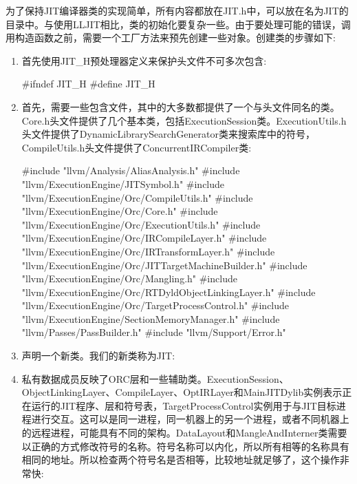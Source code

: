 为了保持JIT编译器类的实现简单，所有内容都放在JIT.h中，可以放在名为JIT的目录中。与使用LLJIT相比，类的初始化要复杂一些。由于要处理可能的错误，调用构造函数之前，需要一个工厂方法来预先创建一些对象。创建类的步骤如下:

\begin{enumerate}
\item
首先使用JIT\_H预处理器定义来保护头文件不可多次包含:

\begin{cpp}
#ifndef JIT_H
#define JIT_H
\end{cpp}

\item
首先，需要一些包含文件，其中的大多数都提供了一个与头文件同名的类。Core.h头文件提供了几个基本类，包括ExecutionSession类。ExecutionUtils.h头文件提供了DynamicLibrarySearchGenerator类来搜索库中的符号，CompileUtils.h头文件提供了ConcurrentIRCompiler类:

\begin{cpp}
#include "llvm/Analysis/AliasAnalysis.h"
#include "llvm/ExecutionEngine/JITSymbol.h"
#include "llvm/ExecutionEngine/Orc/CompileUtils.h"
#include "llvm/ExecutionEngine/Orc/Core.h"
#include "llvm/ExecutionEngine/Orc/ExecutionUtils.h"
#include "llvm/ExecutionEngine/Orc/IRCompileLayer.h"
#include "llvm/ExecutionEngine/Orc/IRTransformLayer.h"
#include "llvm/ExecutionEngine/Orc/JITTargetMachineBuilder.h"
#include "llvm/ExecutionEngine/Orc/Mangling.h"
#include "llvm/ExecutionEngine/Orc/RTDyldObjectLinkingLayer.h"
#include "llvm/ExecutionEngine/Orc/TargetProcessControl.h"
#include "llvm/ExecutionEngine/SectionMemoryManager.h"
#include "llvm/Passes/PassBuilder.h"
#include "llvm/Support/Error.h"
\end{cpp}

\item
声明一个新类。我们的新类称为JIT:

\begin{cpp}
class JIT {
\end{cpp}

\item
私有数据成员反映了ORC层和一些辅助类。ExecutionSession、ObjectLinkingLayer、CompileLayer、OptIRLayer和MainJITDylib实例表示正在运行的JIT程序、层和符号表，TargetProcessControl实例用于与JIT目标进程进行交互。这可以是同一进程，同一机器上的另一个进程，或者不同机器上的远程进程，可能具有不同的架构。DataLayout和MangleAndInterner类需要以正确的方式修改符号的名称。符号名称可以内化，所以所有相等的名称具有相同的地址。所以检查两个符号名是否相等，比较地址就足够了，这个操作非常快:


\end{enumerate}
